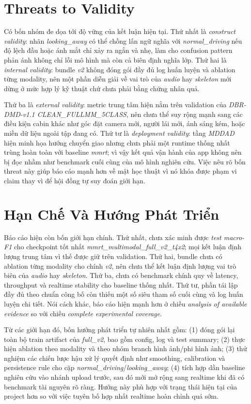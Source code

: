 \documentclass[conference,a4paper]{IEEEtran}
\begin{document}
\section[Threats To Validity]{Threats to Validity}
Có bốn nhóm đe dọa tới độ vững của kết luận hiện tại. Thứ nhất là \textit{construct validity}: nhãn \textit{looking\_away} có thể chồng lấn ngữ nghĩa với \textit{normal\_driving} nếu độ lệch đầu hoặc ánh mắt chỉ xảy ra ngắn và nhẹ, làm cho confusion pattern phản ánh không chỉ lỗi mô hình mà còn cả biên định nghĩa lớp. Thứ hai là \textit{internal validity}: bundle \textit{v2} không đóng gói đầy đủ log huấn luyện và ablation từng modality, nên một phần diễn giải về vai trò của \textit{audio} hay \textit{skeleton} mới dừng ở mức hợp lý kỹ thuật chứ chưa phải bằng chứng nhân quả.

Thứ ba là \textit{external validity}: metric trung tâm hiện nằm trên validation của \textit{DBR-DMD-v1.1 CLEAN\_FULLMM\_5CLASS}, nên chưa thể suy rộng mạnh sang các điều kiện cabin khác như góc đặt camera mới, người lái mới, ánh sáng kém, hoặc miền dữ liệu ngoài tập đang có. Thứ tư là \textit{deployment validity}: tầng \textit{MDDAD} hiện minh họa hướng chuyển giao nhưng chưa phải một runtime thống nhất trùng hoàn toàn với baseline \textit{mmrt}; vì vậy kết quả vận hành của app không nên bị đọc nhầm như benchmark cuối cùng của mô hình nghiên cứu. Việc nêu rõ bốn threat này giúp báo cáo mạnh hơn về mặt học thuật vì nó khóa được phạm vi claim thay vì để hội đồng tự suy đoán giới hạn.

\section[Han Che Va Huong Phat Trien]{Hạn Chế Và Hướng Phát Triển}
Báo cáo hiện còn bốn giới hạn chính. Thứ nhất, chưa xác minh được \textit{test macro-F1} cho checkpoint tốt nhất \textit{mmrt\_multimodal\_full\_v2\_t4x2}; mọi kết luận định lượng trung tâm vì thế được giữ trên validation. Thứ hai, bundle chưa có ablation từng modality cho chính \textit{v2}, nên chưa thể kết luận định lượng vai trò biên của \textit{audio} hay \textit{skeleton}. Thứ ba, chưa có benchmark chính quy về latency, throughput và realtime stability cho baseline thống nhất. Thứ tư, phần tái lập đầy đủ theo chuẩn công bố còn thiếu một số siêu tham số cuối cùng và log huấn luyện chi tiết. Nói cách khác, báo cáo hiện mạnh hơn ở chiều \textit{analysis of available evidence} so với chiều \textit{complete experimental coverage}.

Từ các giới hạn đó, bốn hướng phát triển tự nhiên nhất gồm: (1) đóng gói lại toàn bộ train artifact của \textit{full\_v2}, bao gồm config, log và test summary; (2) thực hiện ablation theo modality và theo nhóm branch hình ảnh/phi hình ảnh; (3) thử nghiệm các chiến lược hậu xử lý quyết định như smoothing, calibration và persistence rule cho cặp \textit{normal\_driving}/\textit{looking\_away}; (4) tích hợp dần baseline nghiên cứu vào nhánh upload trước, sau đó mới mở rộng sang realtime khi đã có benchmark tài nguyên rõ ràng. Hướng này phù hợp với trạng thái hiện tại của project hơn so với việc tuyên bố hợp nhất realtime hoàn chỉnh quá sớm.
\end{document}
